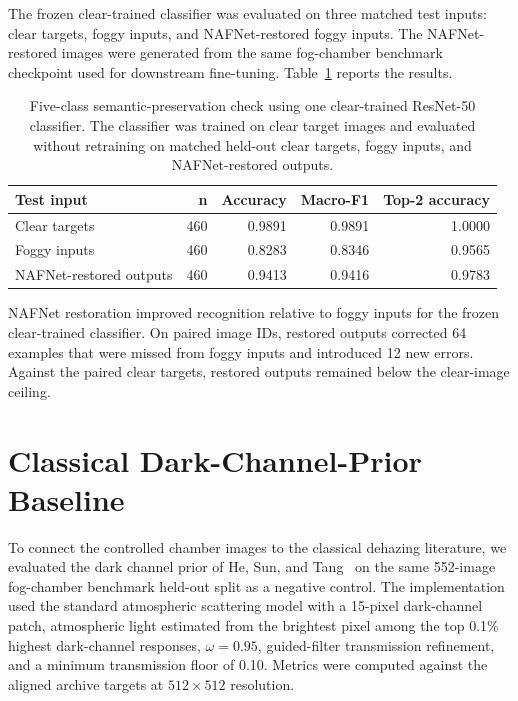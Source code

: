 \documentclass[9pt]{osa-supplemental-document}
\begin{document}
The frozen clear-trained classifier was evaluated on three matched test inputs: clear targets, foggy inputs, and NAFNet-restored foggy inputs. The NAFNet-restored images were generated from the same fog-chamber benchmark checkpoint used for downstream fine-tuning. Table~\ref{tabS:classification_semantic} reports the results.

\begin{table}[htbp]
\centering
\scriptsize
\caption{Five-class semantic-preservation check using one clear-trained ResNet-50 classifier. The classifier was trained on clear target images and evaluated without retraining on matched held-out clear targets, foggy inputs, and NAFNet-restored outputs.}
\label{tabS:classification_semantic}
\begin{tabular}{lrrrr}
\toprule
\textbf{Test input} & \textbf{n} & \textbf{Accuracy} & \textbf{Macro-F1} & \textbf{Top-2 accuracy} \\
\midrule
Clear targets & 460 & 0.9891 & 0.9891 & 1.0000 \\
Foggy inputs & 460 & 0.8283 & 0.8346 & 0.9565 \\
NAFNet-restored outputs & 460 & 0.9413 & 0.9416 & 0.9783 \\
\bottomrule
\end{tabular}
\end{table}

NAFNet restoration improved recognition relative to foggy inputs for the frozen clear-trained classifier. On paired image IDs, restored outputs corrected 64 examples that were missed from foggy inputs and introduced 12 new errors. Against the paired clear targets, restored outputs remained below the clear-image ceiling.
\FloatBarrier

\section{Classical Dark-Channel-Prior Baseline}

To connect the controlled chamber images to the classical dehazing literature, we evaluated the dark channel prior of He, Sun, and Tang~\cite{he2010single} on the same 552-image fog-chamber benchmark held-out split as a negative control. The implementation used the standard atmospheric scattering model with a 15-pixel dark-channel patch, atmospheric light estimated from the brightest pixel among the top 0.1\% highest dark-channel responses, $\omega=0.95$, guided-filter transmission refinement, and a minimum transmission floor of 0.10. Metrics were computed against the aligned archive targets at $512 \times 512$ resolution.
\end{document}
